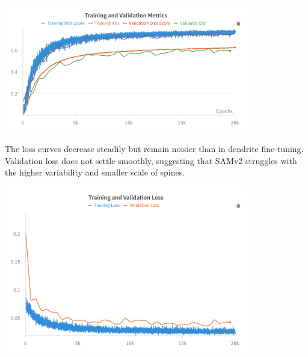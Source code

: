 \begin{center}
\includegraphics[width=0.8\textwidth]{figures/54_samv2_spines_metrics.png}
\label{fig:samv2_spine_training_validation}
\end{center}

The loss curves decrease steadily but remain noisier than in dendrite fine-tuning. Validation loss does not settle smoothly, suggesting that SAMv2 struggles with the higher variability and smaller scale of spines.

\begin{center}
\includegraphics[width=0.8\textwidth]{figures/55_samv2_spines_loss.png}
\label{fig:samv2_dendrite_loss}
\end{center}